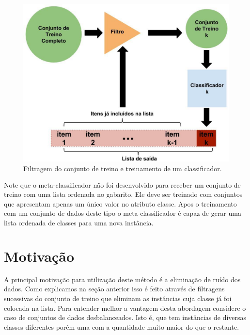 \begin{figure}[h!]
  \includegraphics[width=\linewidth]{images/metodoproposto02.eps}
  \caption{Filtragem do conjunto de treino e treinamento de um classificador.}
  \label{fig:metodoproposto02}
\end{figure}


Note que o meta-classificador não foi desenvolvido para receber um conjunto de treino com uma lista ordenada no gabarito. 
Ele deve ser treinado com conjuntos que apresentam apenas um único valor no atributo classe.
Apos o treinamento com um conjunto de dados deste tipo o meta-classificador é capaz de gerar uma lista ordenada de classes para uma nova instância.

\section{Motivação}

A principal motivação para utilização deste método é a eliminação de ruído dos dados.
Como explicamos na seção anterior isso é feito através de filtragens sucessivas do conjunto de treino que eliminam as instâncias cuja classe já foi colocada na lista.
Para entender melhor a vantagem desta abordagem considere o caso de conjuntos de dados desbalanceados.
Isto é, que tem instâncias de diversas classes diferentes porém uma com a quantidade muito maior do que o restante.

